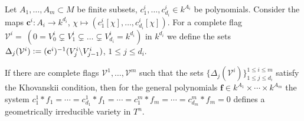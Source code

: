 \begin{corollary}
    Let $A_1, \dots, A_m \subset M$ be finite subsets, $c^i_1, \dots, c^i_{d_i} \in k^{A_i}$ be polynomials. Consider the maps $\mathbf c^i: A_i \to k^{d_i}$, $\chi \mapsto (c^i_1[\chi], \dots, c^i_{d_i} [\chi])$. For a complete flag $\mathcal V^i =~ (0 = V_0^i \subsetneq V_1^i \subsetneq \dots \subsetneq V^i_{d_i} = k^{d_i})$ in $k^{d_i}$ we define the sets $\Delta_j (\mathcal V^i) \vcentcolon= (\mathbf c^i)^{-1}(V^i_j \backslash V^i_{j - 1})$, $1 \le j \le d_i$. 
    
    If there are complete flags $\mathcal V^1, \dots, \mathcal V^m$ such that the sets $\{ \Delta_j(\mathcal V^i) \}^{1 \le i \le m}_{1 \le j \le d_i}$ satisfy the Khovanskii condition, then for the general polynomials $\mathbf f \in k^{A_1} \times \cdots \times k^{A_m}$ the system $c_1^1 * f_1 = \cdots = c^1_{d_1} * f_1 = \cdots = c^m_1 * f_m = \cdots = c^m_{d_m} * f_m = 0$ defines a geometrically irreducible variety in $T^n$.
\end{corollary}
